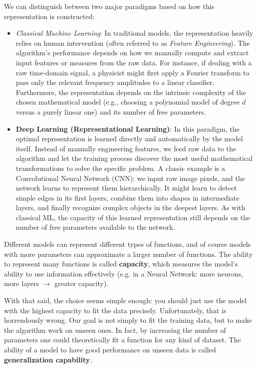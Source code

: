 We can distinguish between two major paradigms based on how this representation is constructed:
\begin{itemize}
    \item[-] \textit{Classical Machine Learning}: In traditional models, the representation heavily relies on human intervention (often referred to as \textit{Feature Engineering}). The algorithm's performance depends on how we manually compute and extract input features or measures from the raw data. For instance, if dealing with a raw time-domain signal, a physicist might first apply a Fourier transform to pass only the relevant frequency amplitudes to a linear classifier. Furthermore, the representation depends on the intrinsic complexity of the chosen mathematical model (e.g., choosing a polynomial model of degree $d$ versus a purely linear one) and its number of free parameters.
    \item[-] \textbf{Deep Learning (Representational Learning)}: In this paradigm, the optimal representation is learned directly and automatically by the model itself. Instead of manually engineering features, we feed raw data to the algorithm and let the training process discover the most useful mathematical transformations to solve the specific problem. A classic example is a Convolutional Neural Network (CNN): we input raw image pixels, and the network learns to represent them hierarchically. It might learn to detect simple edges in its first layers, combine them into shapes in intermediate layers, and finally recognize complex objects in the deepest layers. As with classical ML, the capacity of this learned representation still depends on the number of free parameters available to the network.
\end{itemize}

Different models can represent different types of functions, and of course models with more parameters can approximate a larger number of functions. The ability to represent many functions is called \textbf{capacity}, which measures the model's ability to use information effectively (e.g. in a Neural Network: more neurons, more layers $\to$ greater capacity).

With that said, the choice seems simple enough: you should just use the model with the highest capacity to fit the data precisely. Unfortunately, that is horrendously wrong. Our goal is not simply to fit the training data, but to make the algorithm work on unseen ones. In fact, by increasing the number of parameters one could theoretically fit a function for any kind of dataset. The ability of a model to have good performance on unseen data is called \textbf{generalization capability}. 

